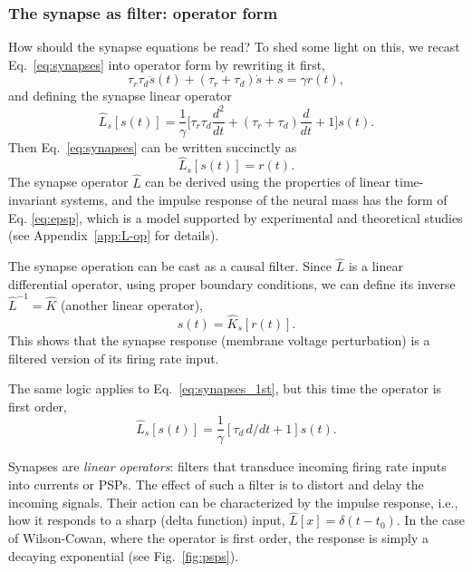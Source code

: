 \documentclass[12pt]{article}
\numberwithin{equation}{section}
\begin{document}
 \subsubsection*{The synapse as filter: operator form}
How should the synapse equations be read? To shed some light on this, we recast Eq.~\eqref{eq:synapses} into operator form by rewriting it first,
$$
    \tau_r\tau_d\ddot s(t) + (\tau_r+\tau_d) \dot s +s = \gamma r(t), 
$$
and defining the synapse linear operator
\begin{equation}
\hat L_s [s(t)]= \frac{1}{\gamma} \big[\tau_r\tau_d \frac{d^2}{dt} + (\tau_r+\tau_d) \frac{d}{dt}  +1\big]s(t).
\end{equation}
Then Eq.~\eqref{eq:synapses}  can be written succinctly as 
\begin{equation} \label{eq:L-operator-synapse-equation}
\hat L_s [s(t)] =  r(t) .
\end{equation}
The synapse operator $\hat{L}$ can be derived using the properties of linear time-invariant systems, and the impulse response of the neural mass has the form of Eq. \eqref{eq:epsp}, which is a model supported by experimental and theoretical studies \cite{rallDendriticLocationSynapses1967,burkeCompositeNatureMonosynaptic1967,nelsonAnomalousRectificationCat1967,rallDistinguishingTheoreticalSynaptic1967} (see Appendix~\ref{app:L-op} for details).

The synapse operation can be cast as a causal filter. Since $\hat L$ is a linear differential operator, using proper boundary conditions, we can define its inverse $\hat L ^{-1}= \hat K$ (another linear operator), 
\begin{equation} \label{eq:K-operator-synapse-equation}
s(t) = \hat K_s[ r(t)] .
\end{equation}
This shows that the synapse response (membrane voltage perturbation) is a filtered version of its firing rate input. 

The same logic applies to Eq.~\ref{eq:synapses_1st}, but this time the operator is first order,
\begin{equation}
\hat L_s [s(t)]= \frac{1}{\gamma}  [\tau_d\, d/dt  +1]s(t).
\end{equation}

Synapses are \textit{linear operators}:  filters that transduce incoming firing rate inputs into currents or PSPs.
 The effect of such a filter is to distort and delay the incoming signals.
Their action can be characterized by the impulse response, i.e.,   how it responds to a sharp (delta function) input, $\hat L[x] = \delta (t-t_0)$. In the case of Wilson-Cowan, where the operator is first order, the response is simply a decaying exponential (see Fig.~\ref{fig:psps}). 
\end{document}
